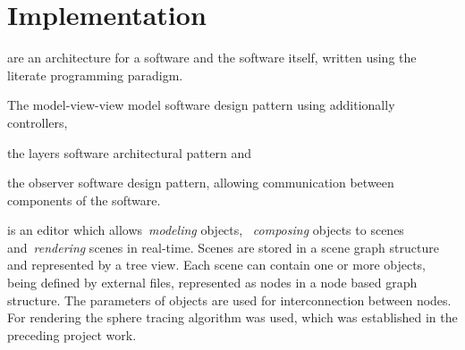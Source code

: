 
\section{Implementation}

 are an architecture for a software and
the software itself, written using the literate programming paradigm.
\begin{enumerate*}
  \item The model-view-view model software design pattern using additionally
    controllers,
  \item the layers software architectural pattern and
  \item the observer software design pattern, allowing communication between
    components of the software.
\end{enumerate*}
 is an editor which allows~\emph{modeling}
objects, ~\emph{composing} objects to scenes and~\emph{rendering} scenes in
real-time. Scenes are stored in a scene graph structure and represented by a
tree view. Each scene can contain one or more objects, being defined by external
files, represented as nodes in a node based graph structure. The parameters of
objects are used for interconnection between nodes. For rendering the sphere
tracing algorithm was used, which was established in the preceding project work.





